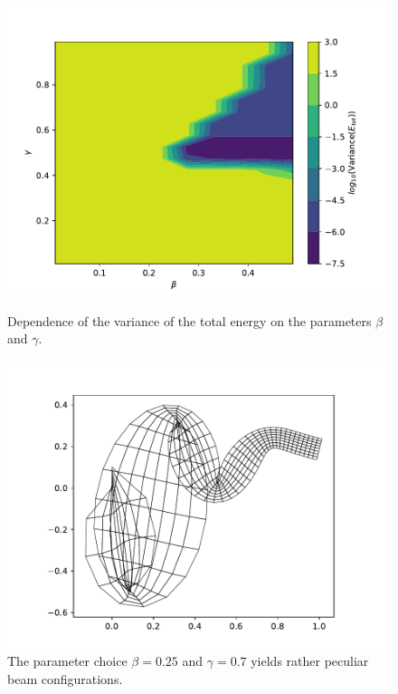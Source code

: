 \documentclass{report}
\begin{document}
\begin{figure}[h]
\centering
\begin{minipage}[t]{0.45\textwidth}
\centering
\includegraphics[width=\textwidth]{../Plots/Project3_main/Figure_910.pdf}
\caption{Dependence of the variance of the total energy on the parameters $\beta$ and $\gamma$.}
\label{pl:beam_exp_betagamma_alpha0}
\end{minipage}
\hfill
\begin{minipage}[t]{0.45\textwidth}
\centering
\includegraphics[width=\textwidth]{../Plots/Project3_main/Figure_50.pdf}
\caption{The parameter choice $\beta=0.25$ and $\gamma=0.7$ yields rather peculiar beam configurations.}
\label{pl:beam_exp_betagamma_instable1}
\end{minipage}
\end{figure}
\end{document}
